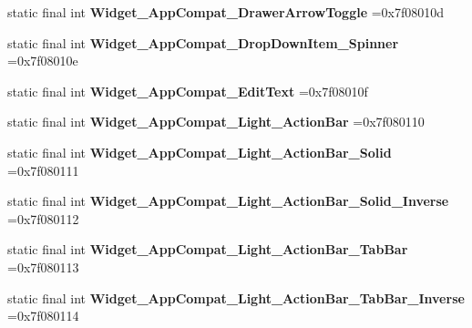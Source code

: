 \begin{DoxyCompactItemize}
\item 
\hypertarget{classcheck_1_1test_1_1_r_1_1style_afe2034c2230bafcb803f177241a8494c}{}static final int {\bfseries Widget\+\_\+\+App\+Compat\+\_\+\+Drawer\+Arrow\+Toggle} =0x7f08010d\label{classcheck_1_1test_1_1_r_1_1style_afe2034c2230bafcb803f177241a8494c}

\item 
\hypertarget{classcheck_1_1test_1_1_r_1_1style_a502cdff7e3306ae55c2c8122a73e8ea9}{}static final int {\bfseries Widget\+\_\+\+App\+Compat\+\_\+\+Drop\+Down\+Item\+\_\+\+Spinner} =0x7f08010e\label{classcheck_1_1test_1_1_r_1_1style_a502cdff7e3306ae55c2c8122a73e8ea9}

\item 
\hypertarget{classcheck_1_1test_1_1_r_1_1style_adb3ed6126e84256a90c285363d9a6d1d}{}static final int {\bfseries Widget\+\_\+\+App\+Compat\+\_\+\+Edit\+Text} =0x7f08010f\label{classcheck_1_1test_1_1_r_1_1style_adb3ed6126e84256a90c285363d9a6d1d}

\item 
\hypertarget{classcheck_1_1test_1_1_r_1_1style_a07cdcb7cc5143efc6847d3f6b4b9d477}{}static final int {\bfseries Widget\+\_\+\+App\+Compat\+\_\+\+Light\+\_\+\+Action\+Bar} =0x7f080110\label{classcheck_1_1test_1_1_r_1_1style_a07cdcb7cc5143efc6847d3f6b4b9d477}

\item 
\hypertarget{classcheck_1_1test_1_1_r_1_1style_a52ed70ce712a65b0cbc6ee9bc201a656}{}static final int {\bfseries Widget\+\_\+\+App\+Compat\+\_\+\+Light\+\_\+\+Action\+Bar\+\_\+\+Solid} =0x7f080111\label{classcheck_1_1test_1_1_r_1_1style_a52ed70ce712a65b0cbc6ee9bc201a656}

\item 
\hypertarget{classcheck_1_1test_1_1_r_1_1style_a13dc8b5f5fc37aebb3a14a71639e2058}{}static final int {\bfseries Widget\+\_\+\+App\+Compat\+\_\+\+Light\+\_\+\+Action\+Bar\+\_\+\+Solid\+\_\+\+Inverse} =0x7f080112\label{classcheck_1_1test_1_1_r_1_1style_a13dc8b5f5fc37aebb3a14a71639e2058}

\item 
\hypertarget{classcheck_1_1test_1_1_r_1_1style_a3673980544a55cf094a18c0f992ccc5c}{}static final int {\bfseries Widget\+\_\+\+App\+Compat\+\_\+\+Light\+\_\+\+Action\+Bar\+\_\+\+Tab\+Bar} =0x7f080113\label{classcheck_1_1test_1_1_r_1_1style_a3673980544a55cf094a18c0f992ccc5c}

\item 
\hypertarget{classcheck_1_1test_1_1_r_1_1style_a1ba533c465bc3e16d15530f8a45b59e3}{}static final int {\bfseries Widget\+\_\+\+App\+Compat\+\_\+\+Light\+\_\+\+Action\+Bar\+\_\+\+Tab\+Bar\+\_\+\+Inverse} =0x7f080114\label{classcheck_1_1test_1_1_r_1_1style_a1ba533c465bc3e16d15530f8a45b59e3}


\end{DoxyCompactItemize}
